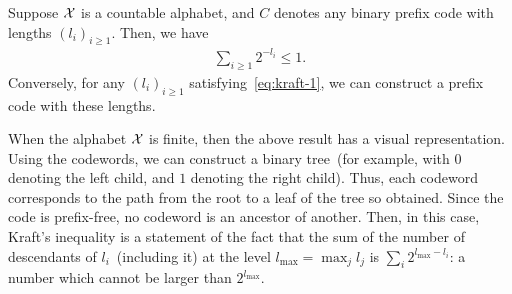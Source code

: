     \begin{theorem}
        \label{thm:kraft-prefix-1}  Suppose $\mathcal{X}$ is a countable alphabet, and $C$ denotes any binary prefix code with lengths $(l_i)_{i \geq 1}$. Then, we have 
        \begin{align}
            \sum_{i \geq 1} 2^{-l_i} \leq 1.  \label{eq:kraft-1}
        \end{align}
        Conversely, for any $(l_i)_{i \geq 1}$ satisfying~\eqref{eq:kraft-1}, we can construct a prefix code with these lengths. 
    \end{theorem}
    \begin{remark}
        \label{remark:kraft-finite-alphabet} When the alphabet $\mathcal{X}$ is finite, then the above result has a visual representation. Using the codewords, we can construct a binary tree~(for example, with $0$ denoting the left child, and $1$ denoting the right child). Thus, each codeword corresponds to the path from the root to a leaf of the tree so obtained. Since the code is prefix-free, no codeword is an ancestor of another. Then, in this case, Kraft's inequality is a statement of the fact that the sum of the number of descendants of $l_i$~(including it) at the level $l_{\max} = \max_{j} l_j$ is $\sum_{i} 2^{l_{\max}-l_i}$: a number which cannot be larger than $2^{l_{\max}}$. 
    \end{remark}
